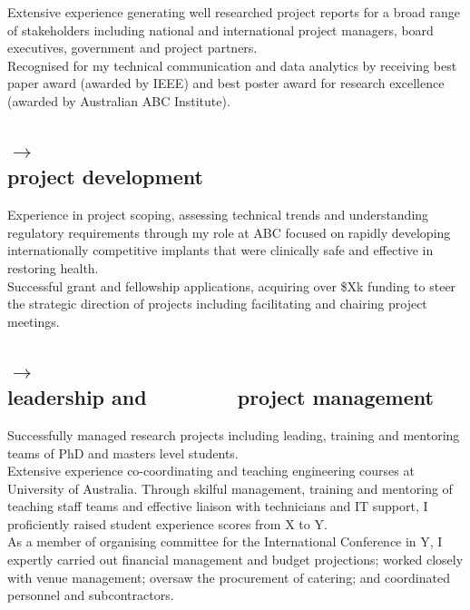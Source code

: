 \documentclass{friggeriEOSG-cv}
\begin{document}
\begin{entrylistDoublecol}
{Extensive experience generating well researched project reports for a broad range of stakeholders including national and international project managers, board executives, government and project partners.\\[-5pt]

Recognised for my technical communication and data analytics by receiving best paper award (awarded by IEEE) and best poster award for research excellence (awarded by Australian ABC Institute).\\
\vspace{0.2cm}
}


\entryDoublecol
{\subsection{{\LARGE$\longrightarrow$}\\{\Large{}project development}}}
{Experience in project scoping, assessing technical trends and understanding regulatory requirements through my role at ABC focused on rapidly developing internationally competitive implants that were clinically safe and effective in restoring health.\\[-5pt]

Successful grant and fellowship applications, acquiring over \$Xk funding to steer the strategic direction of projects including facilitating and chairing project meetings.\\
\vspace{0.2cm}
}

\entryDoublecol
{\subsection{{\LARGE$\longrightarrow$}\\{\Large{}leadership and $\qquad\qquad$ project management}}}
{Successfully managed research projects including leading, training and mentoring teams of PhD and masters level students.\\[-5pt]

Extensive experience co-coordinating and teaching engineering courses at University of Australia. Through skilful management, training and mentoring of teaching staff teams and effective liaison with technicians and IT support, I proficiently raised student experience scores from X to Y. \\[-5pt]

As a member of organising committee for the International Conference in Y, I expertly carried out financial management and budget projections; worked closely with venue management; oversaw the procurement of catering; and coordinated personnel and subcontractors.\\[-5pt]

}
\end{entrylistDoublecol}
\end{document}
